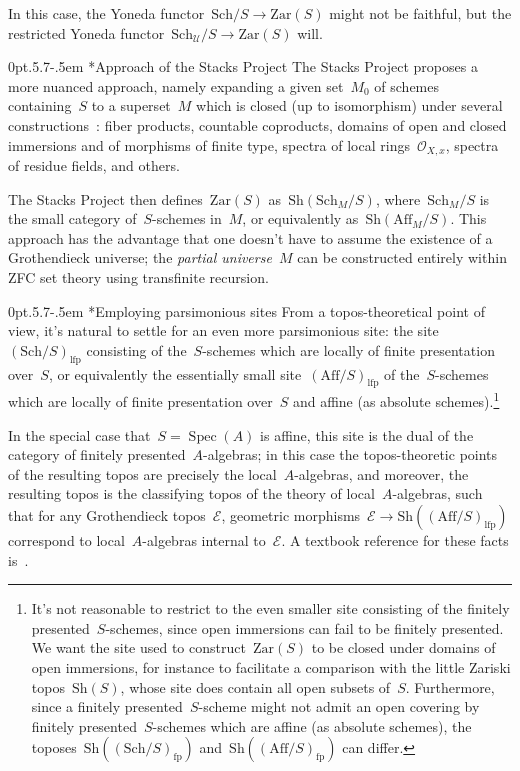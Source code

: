 \documentclass[10pt,reqno,a4paper]{amsbook}
\makeatletter
\theoremstyle{definition}
\theoremstyle{plain}
\theoremstyle{remark}
\newcommand{\E}{\mathcal{E}}
\renewcommand{\O}{\mathcal{O}}
\renewcommand{\U}{\mathcal{U}}
\newcommand{\Sh}{\mathrm{Sh}}
\newcommand{\Zar}{\mathrm{Zar}}
\newcommand{\Sch}{\mathrm{Sch}}
\newcommand{\Aff}{\mathrm{Aff}}
\newcommand{\lfp}{\mathrm{lfp}}
\newcommand{\fp}{\mathrm{fp}}
\DeclareMathOperator{\Spec}{Spec}
\newcommand{\?}{\,{:}\,}
\renewcommand{\_}{\mathpunct{.}\,}
\def\subsection{\@startsection{subsection}{2}%
  {0pt}{.5\linespacing\@plus.7\linespacing}{-.5em}%
  {\normalfont\bfseries}}
\makeatother
\begin{document}
{In this case, the Yoneda functor~$\Sch/S \to \Zar(S)$ might not be faithful,
but the restricted Yoneda functor~$\Sch_\U/S \to \Zar(S)$ will.

\subsection*{Approach of the Stacks Project}
The Stacks Project proposes a more nuanced approach, namely expanding a given
set~$M_0$ of schemes containing~$S$ to a superset~$M$ which is closed (up to
isomorphism) under several constructions~\cite[Tag~000H]{stacks-project}: fiber
products, countable coproducts, domains of open and closed immersions and of
morphisms of finite type, spectra of local rings~$\O_{X,x}$, spectra of residue
fields, and others.

The Stacks Project then defines~$\Zar(S)$ as~$\Sh(\Sch_M/S)$, where~$\Sch_M/S$
is the small category of~$S$-schemes in~$M$, or equivalently
as~$\Sh(\Aff_M/S)$. This approach has the advantage that one doesn't have to
assume the existence of a Grothendieck universe; the \emph{partial
universe}~$M$ can be constructed entirely within ZFC set theory using
transfinite recursion.

\subsection*{Employing parsimonious sites}
From a topos-theoretical point of view, it's natural to settle for an even
more parsimonious site: the site~$(\Sch/S)_\lfp$ consisting of the~$S$-schemes
which are locally of finite presentation over~$S$, or equivalently the
essentially small site~$(\Aff/S)_\lfp$ of the~$S$-schemes which are locally of
finite presentation over~$S$ and affine (as absolute schemes).\footnote{It's
not reasonable to restrict to the even smaller site consisting of the finitely
presented~$S$-schemes, since open immersions can fail to be finitely presented.
We want the site used to construct~$\Zar(S)$ to be closed under domains of open immersions,
for instance to facilitate a comparison with the little
Zariski topos~$\Sh(S)$, whose site does contain all open subsets of~$S$.
Furthermore, since a finitely presented~$S$-scheme might not admit an open
covering by finitely presented~$S$-schemes which are affine (as absolute
schemes), the toposes~$\Sh((\Sch/S)_\fp)$ and~$\Sh((\Aff/S)_\fp)$ can differ.}

In the special case that~$S = \Spec(A)$ is affine, this site is the
dual of the category of finitely presented~$A$-algebras; in this case the
topos-theoretic points of the resulting topos are precisely the local~$A$-algebras,
and moreover, the resulting topos is the classifying topos of the theory of
local~$A$-algebras, such that for any Grothendieck topos~$\E$, geometric
morphisms~$\E \to \Sh((\Aff/S)_\lfp)$ correspond to local~$A$-algebras internal
to~$\E$. A textbook reference for these facts
is~\cite[Section~VIII.6]{moerdijk-maclane:sheaves-logic}.

}
\end{document}
